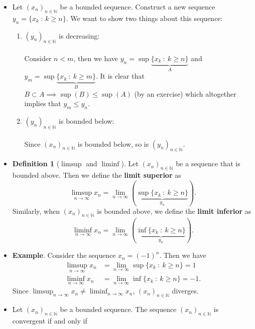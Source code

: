 \documentclass{article}
\newcommand{\N}{\mathbb{N}}
\newcommand{\seq}[2]{(#1_{#2})_{#2 \in \N}}
\newcommand{\mylimmm}[2]{\lim\limits_{#1 \to #2}}
\newcommand{\?}{\stackrel{?}{=}}
\theoremstyle{definition} %
\newtheorem{definition}[theorem]{Definition} %
\begin{document}
\begin{itemize}
    \item Let $\seq{x}{n}$ be a bounded sequence. Construct a new sequence $y_n = \{x_k \ : \ k \geq n\}$. We want to show two things about this sequence:
          \begin{enumerate}[label=(\arabic*)]
              \item $\seq{y}{n}$ is decreasing: \\\\
                    Consider $n < m$, then we have $y_n = \sup\underbrace{\{x_k \ : \ k \geq n\}}_{A}$ and $y_m = \sup\underbrace{\{x_k \ : \ k \geq m\}}_{B}$. It is clear that $B \subset A \implies \sup(B) \leq \sup(A)$ (by an exercise) which altogether implies that $y_m \leq y_n$.
              \item $\seq{y}{n}$ is bounded below: \\\\
                    Since $\seq{x}{n}$ is bounded below, so is $\seq{y}{n}$.
          \end{enumerate}
    \item[]
          \begin{definition}[$\limsup$ and $\liminf$]
              Let $\seq{x}{n}$ be a sequence that is bounded above. Then we define the \textbf{limit superior} as
              $$\limsup_{n \to \infty} x_n = \mylimmm{n}{\infty} \left(\underbrace{\sup\{x_k \ : \ k \geq n\}}_{y_n}\right).$$
              Similarly, when $\seq{x}{n}$ is bounded above, we define the \textbf{limit inferior} as
              $$\liminf_{n \to \infty} x_n = \mylimmm{n}{\infty} \left(\underbrace{\inf\{x_k \ : \ k \geq n\}}_{y_n}\right).$$
          \end{definition}
    \item \textbf{Example}. Consider the sequence $x_n = (-1)^n$. Then we have
          \begin{align*}
              \limsup_{n \to \infty} x_n & = \mylimmm{n}{\infty} \sup\{x_k \ : \ k \geq n\} = 1   \\
              \liminf_{n \to \infty} x_n & = \mylimmm{n}{\infty} \inf\{x_k \ : \ k \geq n\} = -1.
          \end{align*}
          Since $\limsup_{n \to \infty} x_n \neq \liminf_{n \to \infty} x_n$, $\seq{x}{n}$ diverges.
    \item[]
          \begin{theorem}
              Let $\seq{x}{n}$ be a bounded sequence. The sequence $\seq{x}{n}$ is convergent if and only if

\end{theorem}
\end{itemize}
\end{document}
